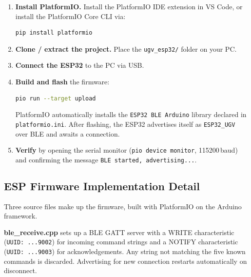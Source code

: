 \documentclass[conference]{IEEEtran}
\begin{document}
	\begin{enumerate}
		\item \textbf{Install PlatformIO.}
		Install the PlatformIO IDE extension in VS Code, or install the
		PlatformIO Core CLI via:
\begin{lstlisting}[language=bash]
    pip install platformio
\end{lstlisting}
		
		\item \textbf{Clone / extract the project.}
		Place the \texttt{ugv\_esp32/} folder on your PC.
		
		
		\item \textbf{Connect the ESP32} to the PC via USB.
		
		\item \textbf{Build and flash} the firmware:
		\begin{lstlisting}[language=bash]
    pio run --target upload
		\end{lstlisting}
		PlatformIO automatically installs the \texttt{ESP32 BLE Arduino}
		library declared in \texttt{platformio.ini}.
		After flashing, the ESP32 advertises itself as \texttt{ESP32\_UGV}
		over BLE and awaits a connection.
		
		\item \textbf{Verify} by opening the serial monitor
		(\texttt{pio device monitor}, 115200\,baud) and confirming the
		message \texttt{BLE started, advertising...}.
	\end{enumerate}

	\subsection{ESP Firmware Implementation Detail}
	\label{app:esp_imple_detail}
	Three source files make up the firmware, built with PlatformIO
	on the Arduino framework.
	
	\textbf{ble\_receive.cpp} sets up a BLE GATT server with a WRITE
	characteristic (\texttt{UUID:~...9002}) for incoming command strings
	and a NOTIFY characteristic (\texttt{UUID:~...9003}) for
	acknowledgements. Any string not matching the five known commands
	is discarded. Advertising for new connection restarts automatically on disconnect.
	
\end{document}
